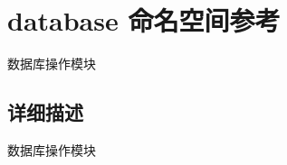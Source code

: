 \hypertarget{namespacedatabase}{}\section{database 命名空间参考}
\label{namespacedatabase}


数据库操作模块  




\subsection{详细描述}
数据库操作模块 